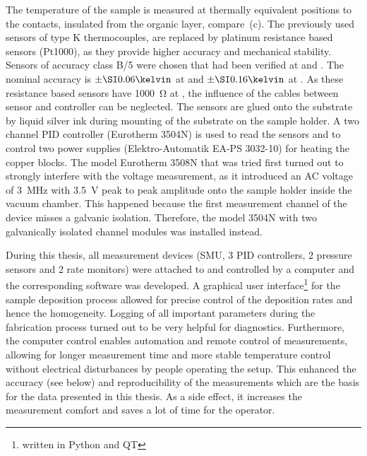 The temperature of the sample is measured at thermally equivalent positions to the contacts, insulated from the organic layer, compare \,(c). The previously used sensors of type K thermocouples, are replaced by platinum resistance based sensors (Pt1000), as they provide higher accuracy and mechanical stability. Sensors of accuracy class B/5 were chosen that had been verified at \T[0] and . The nominal accuracy is $\pm\K{0.06}$ at \T[0] and $\pm\K{0.16}$ at \T[100]. As these resistance based sensors have \SI{1000}{\ohm} at \T[0], the influence of the cables between sensor and controller can be neglected.
The sensors are glued onto the substrate by liquid silver ink during mounting of the substrate on the sample holder. A two channel PID controller (Eurotherm 3504N) is used to read the sensors and to control two power supplies (Elektro-Automatik EA-PS 3032-10) for heating the copper blocks. The model Eurotherm 3508N that was tried first turned out to strongly interfere with the voltage measurement, as it introduced an AC voltage of \SI{3}{\mega\hertz} with \SI{3.5}{\volt} peak to peak amplitude onto the sample holder inside the vacuum chamber. This happened because the first measurement channel of the device misses a galvanic isolation. Therefore, the model 3504N with two galvanically isolated channel modules was installed instead.

During this thesis, all measurement devices (SMU, 3 PID controllers, 2 pressure sensors and 2 rate monitors) were attached to and controlled by a computer and the corresponding software was developed.
A graphical user interface\footnote{written in Python and QT} for the sample deposition process allowed for precise control of the deposition rates and hence the homogeneity. Logging of all important parameters during the fabrication process turned out to be very helpful for diagnostics.
Furthermore, the computer control enables automation and remote control of measurements, allowing for longer measurement time and more stable temperature control without electrical disturbances by people operating the setup. This enhanced the accuracy (see  below) and reproducibility of the measurements which are the basis for the data presented in this thesis. As a side effect, it increases the measurement comfort and saves a lot of time for the operator.

